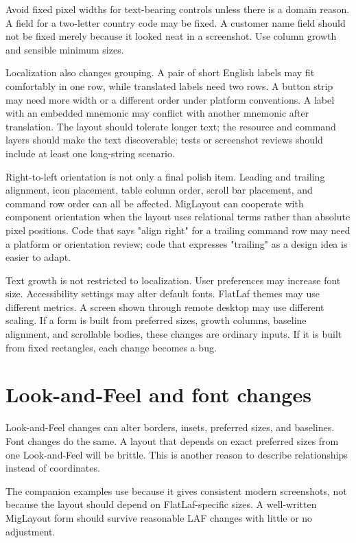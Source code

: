 Avoid fixed pixel widths for text-bearing controls unless there is a domain reason. A field for a two-letter country code may be fixed. A customer name field should not be fixed merely because it looked neat in a screenshot. Use column growth and sensible minimum sizes.

Localization also changes grouping. A pair of short English labels may fit
comfortably in one row, while translated labels need two rows. A button strip
may need more width or a different order under platform conventions. A label
with an embedded mnemonic may conflict with another mnemonic after translation.
The layout should tolerate longer text; the resource and command layers should
make the text discoverable; tests or screenshot reviews should include at least
one long-string scenario.

Right-to-left orientation is not only a final polish item. Leading and trailing
alignment, icon placement, table column order, scroll bar placement, and command
row order can all be affected. MigLayout can cooperate with component
orientation when the layout uses relational terms rather than absolute pixel
positions. Code that says "align right" for a trailing command row may need a
platform or orientation review; code that expresses "trailing" as a design idea
is easier to adapt.

Text growth is not restricted to localization. User preferences may increase
font size. Accessibility settings may alter default fonts. FlatLaf themes may
use different metrics. A screen shown through remote desktop may use different
scaling. If a form is built from preferred sizes, growth columns, baseline
alignment, and scrollable bodies, these changes are ordinary inputs. If it is
built from fixed rectangles, each change becomes a bug.

\section{Look-and-Feel and font changes}

Look-and-Feel changes can alter borders, insets, preferred sizes, and baselines. Font changes do the same. A layout that depends on exact preferred sizes from one Look-and-Feel will be brittle. This is another reason to describe relationships instead of coordinates.

The companion examples use \flatlaf{} because it gives consistent modern screenshots, not because the layout should depend on FlatLaf-specific sizes. A well-written MigLayout form should survive reasonable LAF changes with little or no adjustment.

